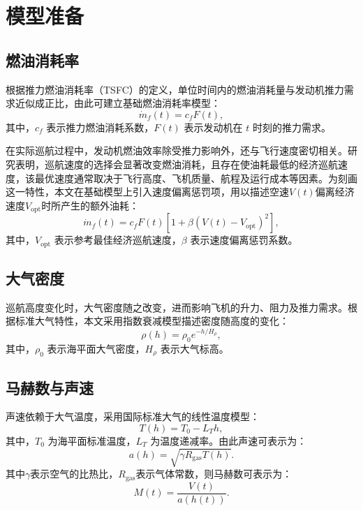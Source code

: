 \documentclass[UTF8]{ctexart}
\begin{document}
\section{模型准备}
\subsection{燃油消耗率}
根据推力燃油消耗率（TSFC）的定义，单位时间内的燃油消耗量与发动机推力需求近似成正比，由此可建立基础燃油消耗率模型：
\begin{equation}
    \dot{m}_f(t)=c_f F(t),
\end{equation}
其中，$c_f$ 表示推力燃油消耗系数，$F(t)$ 表示发动机在 $t$ 时刻的推力需求。

在实际巡航过程中，发动机燃油效率除受推力影响外，还与飞行速度密切相关。研究表明，巡航速度的选择会显著改变燃油消耗，且存在使油耗最低的经济巡航速度，该最优速度通常取决于飞行高度、飞机质量、航程及运行成本等因素\cite{1}。为刻画这一特性，本文在基础模型上引入速度偏离惩罚项，用以描述空速$V(t)$偏离经济速度$V_{\mathrm{opt}}$时所产生的额外油耗：
\begin{equation}
    \dot{m}_f(t)
    =
    c_f F(t)
    \left[
    1+\beta\left(V(t)-V_{\mathrm{opt}}\right)^2
    \right],
\end{equation}
其中，$V_{\mathrm{opt}}$ 表示参考最佳经济巡航速度，$\beta$ 表示速度偏离惩罚系数。

\subsection{大气密度}
巡航高度变化时，大气密度随之改变，进而影响飞机的升力、阻力及推力需求。根据标准大气特性，本文采用指数衰减模型\cite{2}描述密度随高度的变化：
\begin{equation}
    \rho(h)=\rho_0 e^{-h/H_\rho} ,
\end{equation}
其中，$\rho_0$ 表示海平面大气密度，$H_\rho$ 表示大气标高。
\subsection{马赫数与声速}
声速依赖于大气温度，采用国际标准大气的线性温度模型：
\begin{equation}
    T(h)=T_0-L_T h,
    \label{eq:T_model}
\end{equation}
其中，$T_0$ 为海平面标准温度，$L_T$ 为温度递减率。由此声速可表示为：
\begin{equation}
    a(h)=\sqrt{\gamma R_{\mathrm{gas}}T(h)}.
    \label{eq:sound_speed_model}
\end{equation}
其中$\gamma$表示空气的比热比，$R_{\mathrm{gas}}$表示气体常数，则马赫数可表示为：
\begin{equation}
    M(t)=\frac{V(t)}{a(h(t))}.
    \label{eq:mach_model}
\end{equation}
\end{document}
